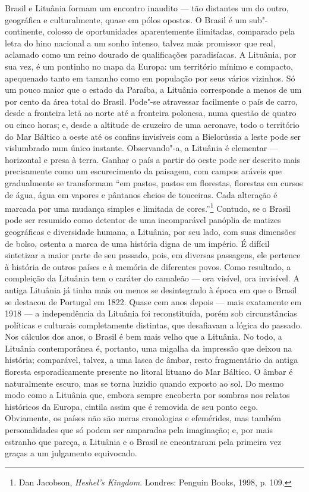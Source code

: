 \noindent{}Brasil e Lituânia formam um encontro inaudito --- tão distantes um do
outro, geográfica e culturalmente, quase em pólos opostos. O Brasil é um
sub"-continente, colosso de oportunidades aparentemente ilimitadas,
comparado pela letra do hino nacional a um sonho intenso, talvez mais
promissor que real, aclamado como um reino dourado de qualificações
paradisíacas. A Lituânia, por sua vez, é um pontinho no mapa da Europa:
um território mínimo e compacto, apequenado tanto em tamanho como em
população por seus vários vizinhos. Só um pouco maior que o estado da
Paraíba, a Lituânia corresponde a menos de um por cento da área total do
Brasil. Pode"-se atravessar facilmente o país de carro, desde a fronteira
letã ao norte até a fronteira polonesa, numa questão de quatro ou cinco
horas; e, desde a altitude de cruzeiro de uma aeronave, todo o
território do Mar Báltico a oeste até os confins invisíveis com a
Bielorússia a leste pode ser vislumbrado num único instante.
Observando"-a, a Lituânia é elementar --- horizontal e presa à terra.
Ganhar o país a partir do oeste pode ser descrito mais precisamente como
um escurecimento da paisagem, com campos aráveis que gradualmente se
transformam ``em pastos, pastos em florestas, florestas em cursos de
água, água em vapores e pântanos cheios de touceiras. Cada alteração é
marcada por uma mudança simples e limitada de cores.''\footnote{Dan Jacobson, \textit{Heshel's Kingdom}. Londres: Penguin Books, 1998, p. 109.}
Contudo, se o Brasil pode ser resumido como detentor de uma incomparável
panóplia de matizes geográficas e diversidade humana, a Lituânia, por
seu lado, com suas dimensões de bolso, ostenta a marca de uma história
digna de um império. É difícil sintetizar a maior parte de seu passado,
pois, em diversas passagens, ele pertence à história de outros
países e à memória de diferentes povos. Como resultado, a compleição da
Lituânia tem o caráter do camaleão --- ora visível, ora invisível. A
antiga Lituânia já tinha mais ou menos se desintegrado à época em que o
Brasil se destacou de Portugal em 1822. Quase cem anos depois --- mais
exatamente em 1918 --- a independência da Lituânia foi reconstituída,
porém sob circunstâncias políticas e culturais completamente distintas,
que desafiavam a lógica do passado. Nos cálculos dos anos, o Brasil é
bem mais velho que a Lituânia. No todo, a Lituânia contemporânea é,
portanto, uma migalha da impressão que deixou na história; comparável,
talvez, a uma lasca de âmbar, resto fragmentário da antiga floresta
esporadicamente presente no litoral lituano do Mar Báltico. O âmbar é
naturalmente escuro, mas se torna luzidio quando exposto ao sol. Do
mesmo modo como a Lituânia que, embora sempre encoberta por sombras nos
relatos históricos da Europa, cintila assim que é removida de seu ponto
cego. Obviamente, os países não são meras cronologias e efemérides, mas
também personalidades que só podem ser amparadas pela imaginação; e, por
mais estranho que pareça, a Lituânia e o Brasil se encontraram pela
primeira vez graças a um julgamento equivocado.

